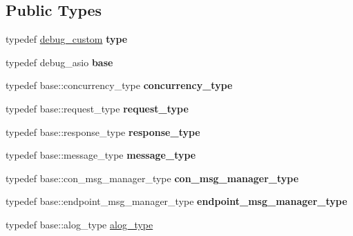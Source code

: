 \subsection*{Public Types}
\begin{DoxyCompactItemize}
\item 
\mbox{\label{structdebug__custom_a0c2f863047e601a152ab98e2f03ff1de}} 
typedef \mbox{\hyperlink{structdebug__custom}{debug\+\_\+custom}} {\bfseries type}
\item 
\mbox{\label{structdebug__custom_ac16a9a8c1bb0eb30b5adb2e9f184fcb3}} 
typedef debug\+\_\+asio {\bfseries base}
\item 
\mbox{\label{structdebug__custom_a1ffdef2a98b021355d9ca159b3a608a0}} 
typedef base\+::concurrency\+\_\+type {\bfseries concurrency\+\_\+type}
\item 
\mbox{\label{structdebug__custom_a5226cebb5634477fc5c0bf15e89242ed}} 
typedef base\+::request\+\_\+type {\bfseries request\+\_\+type}
\item 
\mbox{\label{structdebug__custom_a2828d399543480214d4a12babb9a3122}} 
typedef base\+::response\+\_\+type {\bfseries response\+\_\+type}
\item 
\mbox{\label{structdebug__custom_a38a5b4286284cd3bfbb72376ad188513}} 
typedef base\+::message\+\_\+type {\bfseries message\+\_\+type}
\item 
\mbox{\label{structdebug__custom_a4319caaba89b8dfcc38f97500c296b53}} 
typedef base\+::con\+\_\+msg\+\_\+manager\+\_\+type {\bfseries con\+\_\+msg\+\_\+manager\+\_\+type}
\item 
\mbox{\label{structdebug__custom_a80e300fc1e5108ff0fed4b323ff6cf2f}} 
typedef base\+::endpoint\+\_\+msg\+\_\+manager\+\_\+type {\bfseries endpoint\+\_\+msg\+\_\+manager\+\_\+type}
\item 
\mbox{\label{structdebug__custom_a30b665e32e61e9ded636e08b937786c3}} 
typedef base\+::alog\+\_\+type \mbox{\hyperlink{structdebug__custom_a30b665e32e61e9ded636e08b937786c3}{alog\+\_\+type}}

\end{DoxyCompactItemize}
